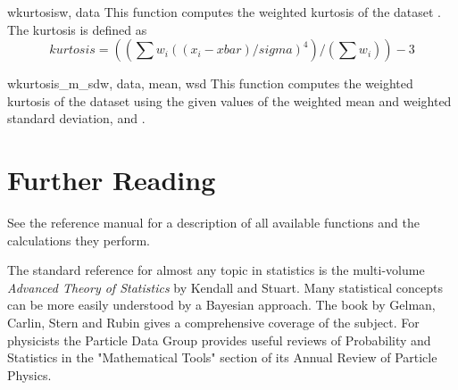 \begin{funcdesc}{wkurtosis}{w, data}
   This function computes the weighted kurtosis of the dataset . The
   kurtosis is defined as 
   \begin{equation}
      kurtosis = ((\sum w_i ((x_i - xbar)/sigma)^4) / (\sum w_i)) - 3
   \end{equation}
\end{funcdesc}

\begin{funcdesc}{wkurtosis_m_sd}{w, data, mean, wsd}
   This function computes the weighted kurtosis of the dataset  using
   the given values of the weighted mean and weighted standard deviation,
    and .
\end{funcdesc}





\section{Further Reading}
\label{sec:stat:further-reading}

See the \gsl{} reference manual for a description of all available functions
and the calculations they perform.

The standard reference for almost any topic in statistics is the multi-volume
\emph{Advanced Theory of Statistics} by Kendall and Stuart.  Many statistical
concepts can be more easily understood by a Bayesian approach.  The book by
Gelman, Carlin, Stern and Rubin gives a comprehensive coverage of the subject.
For physicists the Particle Data Group provides useful reviews of Probability
and Statistics in the "Mathematical Tools" section of its Annual Review of
Particle Physics.
   
\begin{seealso}
   
   
   
   
   
\end{seealso}


